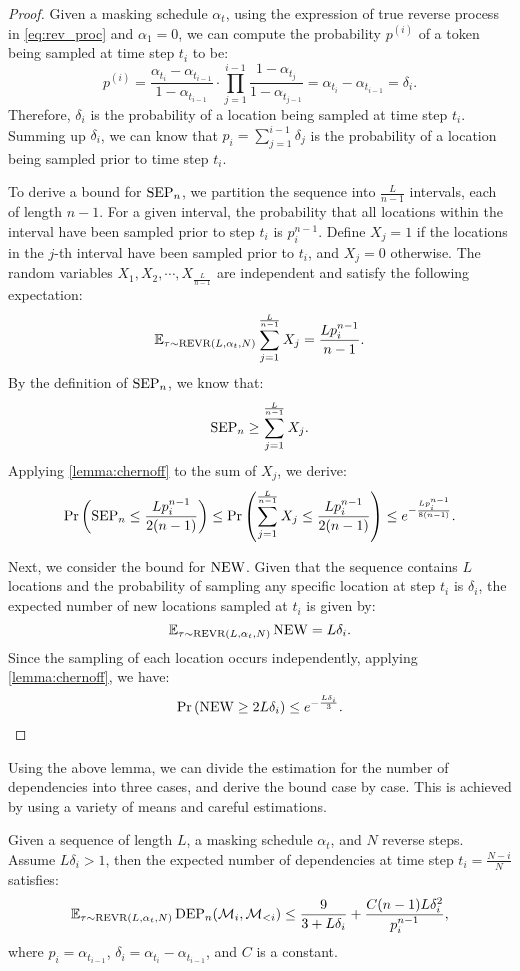 \begin{proof}
Given a masking schedule $\alpha_t$, using the expression of true reverse process in \cref{eq:rev_proc} and $\alpha_1=0$, we can compute the probability $p^{(i)}$ of a token being sampled at time step $t_i$ to be:
$$p^{(i)}=\frac{\alpha_{t_i}-\alpha_{t_{i-1}}}{1-\alpha_{t_{i-1}}}\cdot\prod_{j=1}^{i-1}\frac{1-\alpha_{t_j}}{1-\alpha_{t_{j-1}}}=\alpha_{t_i} - \alpha_{t_{i-1}}=\delta_i.$$
Therefore, $\delta_i$ is the probability of a location being sampled at time step $t_i$. Summing up $\delta_i$, we can know that $p_i=\sum_{j=1}^{i-1}\delta_j$ is the probability of a location being sampled prior to time step $t_i$.

To derive a bound for $\operatorname{SEP}_n$, we partition the sequence into $\frac{L}{n-1}$ intervals, each of length $n-1$. For a given interval, the probability that all locations within the interval have been sampled prior to step $t_i$ is $p_i^{n-1}$. Define $X_j=1$ if the locations in the $j$-th interval have been sampled prior to $t_i$, and $X_j=0$ otherwise. The random variables $X_1,X_2,\cdots,X_{\frac{L}{n-1}}$ are independent and satisfy the following expectation:
$$\mathbb{E}_{\tau \sim \operatorname{REVR}(L, \alpha_t, N)}\sum_{j=1}^{\frac{L}{n-1}}X_j=\frac{Lp_i^{n-1}}{n-1}.$$
By the definition of $\operatorname{SEP}_n$, we know that:
$$\operatorname{SEP}_n\geq\sum_{j=1}^{\frac{L}{n-1}}X_j.$$
Applying \cref{lemma:chernoff} to the sum of $X_j$, we derive:
$$\Pr\left(\operatorname{SEP}_n\leq \frac{Lp_i^{n-1}}{2(n-1)}\right)\leq \Pr\left(\sum_{j=1}^{\frac{L}{n-1}}X_j\leq \frac{Lp_i^{n-1}}{2(n-1)}\right)\leq e^{-\frac{Lp_i^{n-1}}{8(n-1)}}.$$

Next, we consider the bound for $\operatorname{NEW}$. Given that the sequence contains $L$ locations and the probability of sampling any specific location at step $t_i$ is $\delta_i$, the expected number of new locations sampled at $t_i$ is given by:
$$\mathbb{E}_{\tau \sim \operatorname{REVR}(L, \alpha_t, N)}\operatorname{NEW}=L\delta_i.$$
Since the sampling of each location occurs independently, applying \cref{lemma:chernoff}, we have:
$$\Pr\left(\operatorname{NEW}\geq 2L\delta_i\right)\leq e^{-\frac{L\delta_i}{3}}.$$
\end{proof}

Using the above lemma, we can divide the estimation for the number of dependencies into three cases, and derive the bound case by case. This is achieved by using a variety of means and careful estimations.

\begin{lemma}
\label{lemma:bound_dep_rev}
    Given a sequence of length $L$, a masking schedule $\alpha_t$, and $N$ reverse steps. Assume $L\delta_i>1$, then the expected number of dependencies at time step $t_i = \frac{N-i}{N}$ satisfies:
    \[
    \mathbb{E}_{\tau \sim \operatorname{REVR}(L, \alpha_t, N)} \operatorname{DEP}_n({\mathcal{M}}_i, {\mathcal{M}}_{<i}) \leq \frac{9}{3+L\delta_i}+\frac{C(n-1)L\delta_i^2}{p_i^{n-1}},
    \]
    where $p_i = \alpha_{t_{i-1}}$, $\delta_i = \alpha_{t_i} - \alpha_{t_{i-1}}$, and $C$ is a constant.
\end{lemma}

